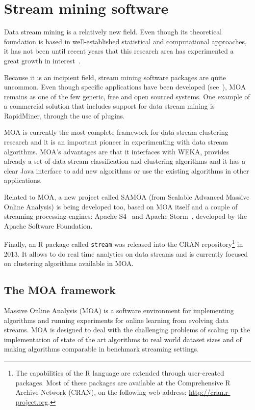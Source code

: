 \section{Stream mining software}
\label{State::StreamMining}

Data stream mining is a relatively new field. Even though its theoretical foundation is based in well-established statistical and computational approaches, it has not been until recent years that this research area has experimented a great growth in interest~\citet{Gaber:MiningDataStreamsReview}.

Because it is an incipient field, stream mining software packages are quite uncommon. Even though specific applications have been developed (see~\citet{Kargupta:MineFleet}), MOA remains as one of the few generic, free and open sourced systems. One example of a commercial solution that includes support for data stream mining is RapidMiner, through the use of plugins. 

MOA is currently the most complete framework for data stream clustering research and it is an important pioneer in experimenting with data stream algorithms. MOA's advantages are that it interfaces with WEKA, provides already a set of data stream classification and clustering algorithms and it has a clear Java interface to add new algorithms or use the existing algorithms in other applications.

Related to MOA, a new project called SAMOA (from Scalable Advanced Massive Online Analysis) is being developed too, based on MOA itself and a couple of streaming processing engines: Apache S4~\citep{web:ApacheS4} and Apache Storm~\citep{web:ApacheStorm}, developed by the Apache Software Foundation.

Finally, an R package called \texttt{stream} was released into the CRAN repository\footnote{The capabilities of the R language are extended through user-created packages. Most of these packages are available at the Comprehensive R Archive Network (CRAN), on the following web address: \url{http://cran.r-project.org}.} in 2013. It allows to do real time analytics on data streams and is currently focused on clustering algorithms available in MOA.

\subsection{The MOA framework}

Massive Online Analysis (MOA) is a software environment for implementing algorithms and running experiments for online learning from evolving data streams. MOA is designed to deal with the challenging problems of scaling up the implementation of state of the art algorithms to real world dataset sizes and of making algorithms comparable in benchmark streaming settings.

